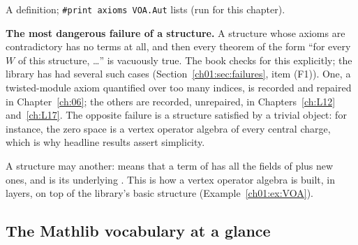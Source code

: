 \begin{status}
A definition; \texttt{\#print axioms VOA.Aut} lists 
(run for this chapter).
\end{status}

\textbf{The most dangerous failure of a structure.} A structure whose axioms are contradictory has no
terms at all, and then every theorem of the form ``for every $W$ of this structure, \dots'' is
vacuously true. The book checks for this explicitly; the library has had several such cases
(Section~\ref{ch01:sec:failures}, item (F1)). One, a twisted-module axiom quantified over too many
indices, is recorded and repaired in Chapter~\ref{ch:06}; the others are recorded, unrepaired, in
Chapters~\ref{ch:L12} and~\ref{ch:L17}. The opposite failure is a structure satisfied by a trivial object: for
instance, the zero space is a vertex operator algebra of every central charge, which is why
headline results assert simplicity.

A structure may  another:  means that a term of  has
all the fields of  plus new ones, and  is its underlying . This is how a
vertex operator algebra is built, in layers, on top of the library's basic structure 
(Example~\ref{ch01:ex:VOA}).

\subsection{The Mathlib vocabulary at a glance}

